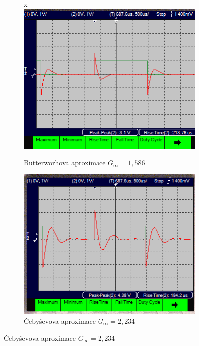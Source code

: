 \documentclass[twoside]{article}
\begin{document}
\begin{figure}[h!]
    \begin{subfigure}{0.48\textwidth}
        \centering
x        \includegraphics[width=1\linewidth]{step_butter.png}
        \caption{Butterworhova aproximace $G_{\infty} = 1,586$}
        \label{fig:step_butter}
    \end{subfigure}
    \begin{subfigure}{0.48\textwidth}
        \centering
        \includegraphics[width=1\linewidth]{step_cebysev.png}
        \caption{Čebyševova aproximace $G_{\infty} = 2,234$}
        \label{fig:step_cebysev}
    \end{subfigure}


\end{figure}
\end{document}
